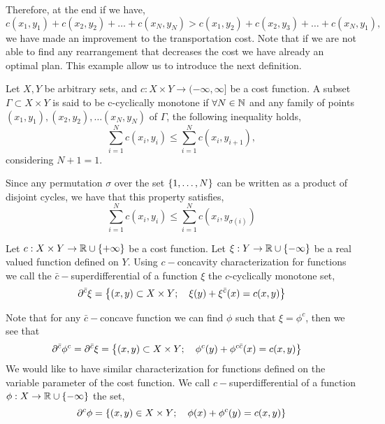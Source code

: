 Therefore, at the end if we have, 
\begin{equation*}
	c(x_1, y_1)+c(x_2, y_2)+\dots+c(x_N, y_N)> c(x_1, y_2)+c(x_2,y_3)+\dots+c(x_N, y_1), 
\end{equation*}
we have made an improvement to the transportation cost.  Note that if we are not able to find any rearrangement that decreases the cost we have already an optimal plan. This example allow us to introduce the next definition.
\begin{definition}
	Let $X , Y$ be arbitrary sets, and $c:X\times Y \rightarrow (-\infty, \infty]$ be a cost function. A subset $\Gamma \subset X \times Y$ is said to be c-cyclically monotone if $\forall N\in\mathbb{N}$ and any family of points $(x_1, y_1), (x_2, y_2), \dots (x_N, y_N)$ of $\Gamma$, the following inequality holds,
	\begin{equation*}
	\sum_{i=1}^{N} c(x_i, y_i) \leq \sum_{i=1}^{N} c(x_i, y_{i+1}),
	\end{equation*} 
	considering $N+1=1$. 
\end{definition}
Since any permutation $\sigma$ over the set $\left\lbrace 1, \dots, N \right\rbrace$ can be written as a product of disjoint cycles, we have that this property satisfies,
\begin{equation}
\sum_{i=1}^{N} c(x_i, y_i) \leq \sum_{i=1}^{N} c(x_i, y_{\sigma(i)}) 
\end{equation}


\begin{definition}
Let $c:X\times Y \rightarrow \mathbb{R}\cup\left\lbrace +\infty \right\rbrace$ be a cost function. Let $\xi:Y\rightarrow \mathbb{R}\cup\left\lbrace -\infty \right\rbrace$ be a real valued function defined on $Y$. Using $c-$concavity characterization for functions we call the  $\bar c-$superdifferential of a function $\xi$ the $c$-cyclically monotone set,
\begin{equation}
	\partial^{\bar c} \xi=\left\lbrace (x,y)\subset X\times Y;\quad \xi(y)+\xi^{\bar{c}}(x)=c(x,y) \right\rbrace 
\end{equation}
\end{definition}
Note that for any $\bar c-$concave function we can find $\phi$ such that $\xi=\phi^{c}$, then we see that
\begin{align*}
	\partial^{\bar c}\phi^c=\partial^{\bar c}\xi &=\left\lbrace (x, y)\subset X\times Y;\quad \phi^{c}(y)+\phi^{c\bar c}(x)=c(x,y) \right\rbrace
\end{align*}
We would like to have similar characterization for functions defined on the variable parameter of the cost function. We call $c-$superdifferential of a function $\phi: X\rightarrow \mathbb{R} \cup\left\lbrace -\infty \right\rbrace$ the set,
\begin{equation*}
	\partial^{c}\phi=\left\lbrace (x,y)\in X\times Y;\quad \phi(x)+\phi^c(y)=c(x,y) \right\rbrace
\end{equation*}

